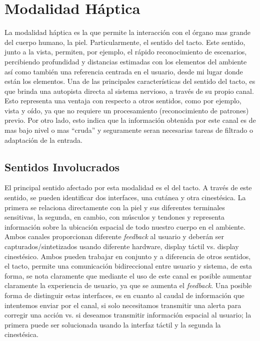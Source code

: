 
\chapter{Modalidad H\'{a}ptica} %

\label{ch:mod_haptic} 

La modalidad háptica es la que permite la interacción con el órgano mas grande del cuerpo humano, la piel. Particularmente, el sentido del tacto. Este sentido, junto a la vista, permiten, por ejemplo, el rápido reconocimiento de escenarios, percibiendo profundidad y distancias estimadas con los elementos del ambiente así como también una referencia centrada en el usuario, \ie desde mi lugar donde están los elementos.
Una de las principales características del sentido del tacto, es que brinda una autopista directa al sistema nervioso, a través de su propio canal. Esto representa una ventaja con respecto a otros sentidos, como por ejemplo, vista y oído, ya que no requiere un procesamiento (reconocimiento de patrones) previo. Por otro lado, esto indica que la información obtenida por este canal es de mas bajo nivel o mas ``cruda'' y seguramente seran necesarias tareas de filtrado o adaptación de la entrada.



\section{Sentidos Involucrados}
El principal sentido afectado por esta modalidad es el del tacto. A través de este sentido, se pueden identificar dos interfaces, una cutánea y otra cinestésica. La primera se relaciona directamente con la piel y sus diferentes terminales sensitivas, la segunda, en cambio, con músculos y tendones y representa información sobre la ubicación espacial de todo nuestro cuerpo en el ambiente. Ambos canales proporcionan diferente \emph{feedback} al usuario y deberán ser capturados/sintetizados usando diferente hardware, \ie display táctil vs. display cinestésico. Ambos pueden trabajar en conjunto y a diferencia de otros sentidos, el tacto, permite una comunicación bidireccional entre usuario y sistema, de esta forma, se nota claramente que mediante el uso de este canal es posible aumentar claramente la experiencia de usuario, ya que se aumenta el \emph{feedback}. Una posible forma de distinguir estas interfaces, es en cuanto al caudal de información que intentemos enviar por el canal, \ie si solo necesitamos transmitir una alerta para corregir una acción vs. si deseamos transmitir información espacial al usuario; la primera puede ser solucionada usando la interfaz táctil y la segunda la cinestésica.

